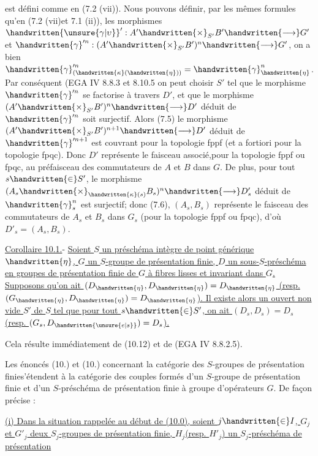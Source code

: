 est défini comme en (7.2 (vii)). Nous pouvons définir, par les mêmes formules qu'en (7.2 (vii)et 7.1 (ii)), les morphismes $\handwritten{\unsure{\gamma|\upsilon}}':A'\handwritten{\times}_{S'}B'\handwritten{\longrightarrow}G'$ et $\handwritten{\gamma}'^n:(A'\handwritten{\times}_{S'}B')^n\handwritten{\longrightarrow}G'$, on a bien $\handwritten{\gamma}'^n_{(\handwritten{\kappa}(\handwritten{\eta}))}=\handwritten{\gamma}^n_{\handwritten{\eta}}$. Par conséquent (EGA IV 8.8.3 et 8.10.5\deleted{)}\handwritten{,} on peut choisir $S'$ tel que le morphisme $\handwritten{\gamma}'^n$ se factorise à travers $D'$, et que le morphisme $(A'\handwritten{\times}_{S'}B')^n\handwritten{\longrightarrow}D'$ déduit de $\handwritten{\gamma}'^n$ soit surjectif. Alors (7.5) le morphisme $(A'\handwritten{\times}_{S'}B')^{n+1}\handwritten{\longrightarrow}D'$ déduit de $\handwritten{\gamma}'^{n+1}$ est couvrant pour la topologie fppf (et a fortiori pour la topologie fpqc). Donc $D'$ représente le faisceau associé,pour la topologie fppf ou fpqc, au préfaisceau des commutateurs de $A$ et $B$ dans $G$. De plus, pour tout $s\handwritten{\in}S'$, le morphisme $(A_s\handwritten{\times}_{\handwritten{\kappa}(s)}B_s)^n\handwritten{\longrightarrow}D'_s$ déduit de $\handwritten{\gamma}^n_s$ est surjectif; donc (7.6), $(A_s,B_s)$ représente le faisceau des commutateurs de $A_s$ et $B_s$ dans $G_s$ (pour la topologie fppf ou fpqc), d'où $D'_s=(A_s,B_s)$.

\uline{Corollaire 10.1.}- \uline{Soient $S$ un préschéma intègre de point générique $\handwritten{\eta}$, $G$ un $S$-groupe de présentation finie, $D$ un sous-$S$-préschéma en groupes de présentation finie de $G$ à fibres lisses et invariant dans $G$. Supposons qu'on ait $(D_{\handwritten{\eta}},D_{\handwritten{\eta}})=D_{\handwritten{\eta}}$ (resp. $(G_{\handwritten{\eta}},D_{\handwritten{\eta}})=D_{\handwritten{\eta}}$). Il existe alors un ouvert non vide $S'$ de $S$ tel que pour tout $s\handwritten{\in}S'$, on ait $(D_s,D_s)=D_s$ (resp. $(G_s,D_{\handwritten{\unsure{e|s}}})=D_s$).}

Cela résulte immédiatement de (10.12) et de (EGA IV 8.8.2.5).

Les énoncés (10.) et (10.) concernant la catégorie des $S$-groupes de présentation finie\handwritten{[}s'étendent à la catégorie des couples formés d'un $S$-groupe de présentation finie et d'un  $S$-préschéma de présentation finie à groupe d'opérateurs $G$. De façon précise :

 \uline{(i) Dans la situation rappelée au début de (10.0), soient $j\handwritten{\in}I$, $G_j$ et $G'_j$ deux $S_j$-groupes de présentation finie, $H_j$(resp. $H'_j$) un $S_j$-préschéma de présentation}

